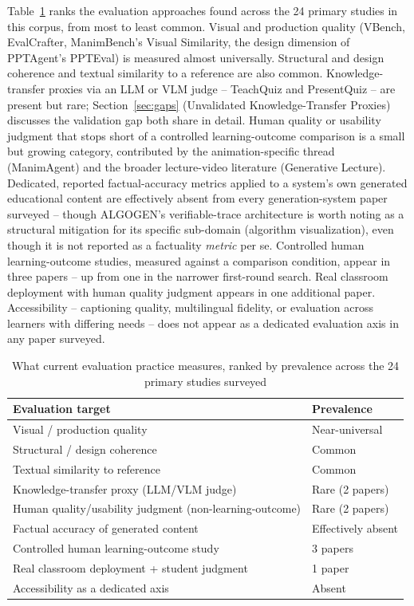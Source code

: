 \documentclass[journal]{IEEEtran}
\begin{document}
Table~\ref{tab:eval-taxonomy} ranks the evaluation approaches found across the 24 primary studies in this corpus, from most to least common. Visual and production quality (VBench, EvalCrafter, ManimBench's Visual Similarity, the design dimension of PPTAgent's PPTEval) is measured almost universally. Structural and design coherence and textual similarity to a reference are also common. Knowledge-transfer proxies via an LLM or VLM judge -- TeachQuiz and PresentQuiz -- are present but rare; Section~\ref{sec:gaps} (Unvalidated Knowledge-Transfer Proxies) discusses the validation gap both share in detail. Human quality or usability judgment that stops short of a controlled learning-outcome comparison is a small but growing category, contributed by the animation-specific thread (ManimAgent) and the broader lecture-video literature (Generative Lecture). Dedicated, reported factual-accuracy metrics applied to a system's own generated educational content are effectively absent from every generation-system paper surveyed -- though ALGOGEN's verifiable-trace architecture is worth noting as a structural mitigation for its specific sub-domain (algorithm visualization), even though it is not reported as a factuality \emph{metric} per se. Controlled human learning-outcome studies, measured against a comparison condition, appear in three papers -- up from one in the narrower first-round search. Real classroom deployment with human quality judgment appears in one additional paper. Accessibility -- captioning quality, multilingual fidelity, or evaluation across learners with differing needs -- does not appear as a dedicated evaluation axis in any paper surveyed.

\begin{table}[t]
\caption{What current evaluation practice measures, ranked by prevalence across the 24 primary studies surveyed}
\label{tab:eval-taxonomy}
\centering
\begin{tabular}{p{4.6cm}p{2.6cm}}
\hline
\textbf{Evaluation target} & \textbf{Prevalence} \\
\hline
Visual / production quality & Near-universal \\
Structural / design coherence & Common \\
Textual similarity to reference & Common \\
Knowledge-transfer proxy (LLM/VLM judge) & Rare (2 papers) \\
Human quality/usability judgment (non-learning-outcome) & Rare (2 papers) \\
Factual accuracy of generated content & Effectively absent \\
Controlled human learning-outcome study & 3 papers \\
Real classroom deployment + student judgment & 1 paper \\
Accessibility as a dedicated axis & Absent \\
\hline
\end{tabular}
\end{table}
\end{document}
